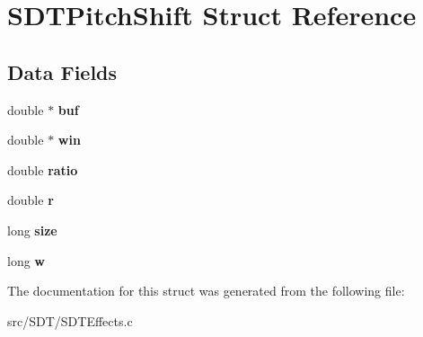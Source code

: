 \hypertarget{struct_s_d_t_pitch_shift}{}\section{S\+D\+T\+Pitch\+Shift Struct Reference}
\label{struct_s_d_t_pitch_shift}
\subsection*{Data Fields}
\begin{DoxyCompactItemize}
\item 
\hypertarget{struct_s_d_t_pitch_shift_a33295bb8f8885c76a0d2a44eb3d742f3}{}double $\ast$ {\bfseries buf}\label{struct_s_d_t_pitch_shift_a33295bb8f8885c76a0d2a44eb3d742f3}

\item 
\hypertarget{struct_s_d_t_pitch_shift_a0db7743ca63ebec1838ca74753ac8894}{}double $\ast$ {\bfseries win}\label{struct_s_d_t_pitch_shift_a0db7743ca63ebec1838ca74753ac8894}

\item 
\hypertarget{struct_s_d_t_pitch_shift_aa422b0077d0c570937a73aa5b8eb4440}{}double {\bfseries ratio}\label{struct_s_d_t_pitch_shift_aa422b0077d0c570937a73aa5b8eb4440}

\item 
\hypertarget{struct_s_d_t_pitch_shift_a880a49112fedae68e714341a9a082fb6}{}double {\bfseries r}\label{struct_s_d_t_pitch_shift_a880a49112fedae68e714341a9a082fb6}

\item 
\hypertarget{struct_s_d_t_pitch_shift_a37363161b41c4165b98cba7abc7a9d95}{}long {\bfseries size}\label{struct_s_d_t_pitch_shift_a37363161b41c4165b98cba7abc7a9d95}

\item 
\hypertarget{struct_s_d_t_pitch_shift_a6b32d5f3c48c1843aabb8ca4eb03c777}{}long {\bfseries w}\label{struct_s_d_t_pitch_shift_a6b32d5f3c48c1843aabb8ca4eb03c777}

\end{DoxyCompactItemize}


The documentation for this struct was generated from the following file\+:\begin{DoxyCompactItemize}
\item 
src/\+S\+D\+T/S\+D\+T\+Effects.\+c\end{DoxyCompactItemize}
